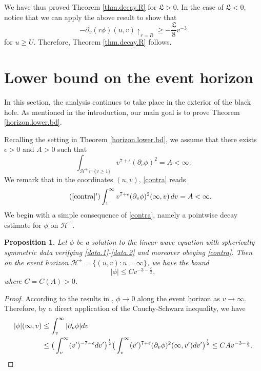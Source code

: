 \documentclass[12 pt, reqno]{amsart}
\newtheorem{proposition}[theorem]{Proposition}
\theoremstyle{definition}
\theoremstyle{remark}
\numberwithin{equation}{section}
\newcommand{\set}[1]{\{#1\}}
\newcommand{\ep}{\epsilon}
\newcommand{\ud}{d}
\newcommand{\rd}{\partial}
\newcommand{\0}{\emptyset}
\newcommand{\eps}{\epsilon}
\newcommand{\calH}{\mathcal H}
\newcommand{\f}{\frac}
\newcommand{\EH}{\calH^{+}}
\begin{document}
We have thus proved Theorem \ref{thm.decay.R} for $\mathfrak L>0$. In the case of $\mathfrak L<0$, notice that we can apply the above result to show that 
$$-\rd_v(r\phi)(u,v)\restriction_{r=R}\geq -\f{\mathfrak L}{8}v^{-3}$$
for $u\geq U$. Therefore, Theorem \ref{thm.decay.R} follows.

\section{Lower bound on the event horizon}\label{sec.horizon}
In this section, the analysis continues to take place in the exterior of the black hole. As mentioned in the introduction, our main goal is to prove Theorem \ref{horizon.lower.bd}.

Recalling the setting in Theorem \ref{horizon.lower.bd}, we assume that there exists $\eps > 0$ and $A>0$ such that
\begin{equation}\label{contra}
\int_{\EH \cap \set{v \geq 1}} v^{7 + \eps} (\rd_{v} \phi)^{2} = A < \infty.
\end{equation}
We remark that in the coordinates $(u,v)$, \eqref{contra} reads
\begin{equation*} \tag{\ref{contra}$'$}
	\int_{1}^{\infty} v^{7+\eps} (\rd_{v} \phi)^{2}(\infty, v) \, \ud v = A < \infty.
\end{equation*}
We begin with a simple consequence of \eqref{contra}, namely a pointwise decay estimate for $\phi$ on $\mathcal H^+$.
\begin{proposition}\label{prop:EH:phi}
Let $\phi$ be a solution to the linear wave equation with spherically symmetric data verifying \eqref{data.1}-\eqref{data.2} and moreover obeying \eqref{contra}. Then on the event horizon $\EH = \set{(u, v) : u = \infty}$, we have the bound
\begin{equation} \label{eq:EH:phi}
|\phi|\leq Cv^{-3-\frac{\ep}{2}},
\end{equation}
where $C = C(A) > 0$.
\end{proposition}

\begin{proof}
According to the results in \cite{DRPL}, $\phi\to 0$ along the event horizon as $v\to \infty$. Therefore, by a direct application of the Cauchy-Schwarz inequality, we have
\begin{equation*}
\begin{split}
|\phi|(\infty,v)&\leq \int_v^{\infty}|\rd_v\phi| dv \\
&\leq \big(\int_v^{\infty} (v')^{-7-\ep} dv'\big)^{\frac 12} \big(\int_v^{\infty} (v')^{7+\ep}(\rd_v\phi)^2(\infty,v') dv'\big)^{\frac 12}\leq C A v^{-3-\frac{\ep}{2}}. \qedhere
\end{split}
\end{equation*}
\end{proof}
\end{document}
